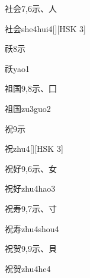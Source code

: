 \begin{entry}{社会}{7,6}{⽰、⼈}
  \begin{phonetics}{社会}{she4hui4}[][HSK 3]
  \end{phonetics}
\end{entry}

\begin{entry}{祅}{8}{⽰}
  \begin{phonetics}{祅}{yao1}
  \end{phonetics}
\end{entry}

\begin{entry}{祖国}{9,8}{⽰、⼞}
  \begin{phonetics}{祖国}{zu3guo2}
  \end{phonetics}
\end{entry}

\begin{entry}{祝}{9}{⽰}
  \begin{phonetics}{祝}{zhu4}[][HSK 3]
  \end{phonetics}
\end{entry}

\begin{entry}{祝好}{9,6}{⽰、⼥}
  \begin{phonetics}{祝好}{zhu4hao3}
  \end{phonetics}
\end{entry}

\begin{entry}{祝寿}{9,7}{⽰、⼨}
  \begin{phonetics}{祝寿}{zhu4shou4}
  \end{phonetics}
\end{entry}

\begin{entry}{祝贺}{9,9}{⽰、⾙}
  \begin{phonetics}{祝贺}{zhu4he4}
  \end{phonetics}
\end{entry}

